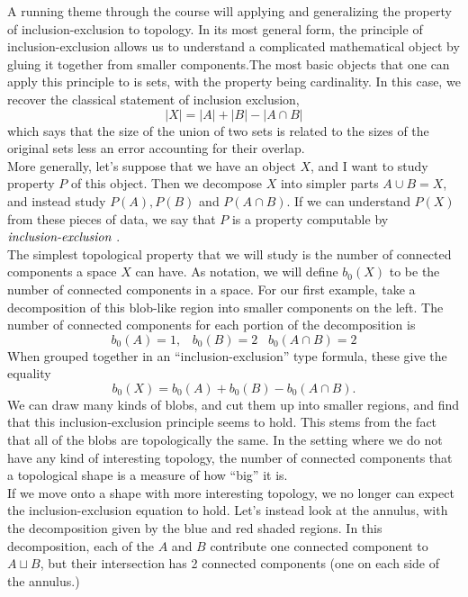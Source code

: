 \begin{doubledtuftepage}
A running theme through the course will applying and generalizing the property of inclusion-exclusion to topology. In its most general form, the principle of inclusion-exclusion allows us to understand a complicated mathematical object by gluing it together from smaller components.The most basic objects that one can apply this principle to is sets, with the property being cardinality. In this case, we recover the classical statement of inclusion exclusion,
\[|X|=|A|+|B|-|A\cap B|\]
which says that the size of the union of two sets is related to the sizes of the original sets less an error accounting for their overlap. \\ 
More generally, let's suppose that we have an object $X$, and I want to study property $P$ of this object. Then we decompose $X$ into simpler parts $A\cup B=X$, and instead study $P(A), P(B)$ and $P(A\cap B)$. If we can understand $P(X)$ from these pieces of data, we say that $P$ is a property computable by $\emph{inclusion-exclusion}$ .\\
The simplest topological property that we will study is the number of connected components a space $X$ can have. As notation, we will define $b_0(X)$ to be the number of connected components in a space. For our first example,  take a decomposition of this blob-like region into smaller components on the left. The number of connected components for each portion of the decomposition is\[ b_0(A)=1,\;\;\; b_0(B)= 2\;\;\; b_0(A\cap B)=2\]
When grouped together in an ``inclusion-exclusion''  type formula, these give the equality
\[b_0(X)= b_0(A)+b_0(B)-b_0(A\cap B).\]
We can draw many kinds of blobs, and cut them up into smaller regions, and find that this inclusion-exclusion principle seems to hold. This stems from the fact that all of the blobs are topologically the same. In the setting where we do not have any kind of interesting topology, the number of connected components that a topological shape is a measure of how ``big'' it is. \\
If we move onto a shape with more interesting topology, we no longer can expect the inclusion-exclusion equation to hold. Let's instead look at the annulus, with the decomposition given by the blue and red shaded regions.  In this decomposition, each of the $A$ and $B$ contribute one connected component to $A\sqcup B$, but their intersection has 2 connected components (one on each side of the annulus.) 

\end{doubledtuftepage}

